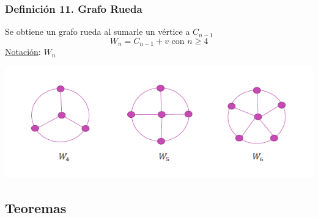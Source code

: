 \documentclass{article}
\begin{document}
\subsubsection*{Definición 11. Grafo Rueda}
Se obtiene un grafo rueda al sumarle un vértice a $C_{n-1}$
\begin{equation*}
    W_n = C_{n-1} + v \text{ con } n \geq 4 
\end{equation*}
\underline{Notación}: $W_n$
\begin{center}
    \includegraphics[width=.70\textwidth]{grafoRueda.PNG}
\end{center}

\subsection{Teoremas}
\end{document}
